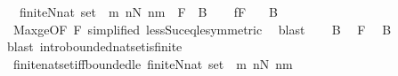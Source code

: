 \begin{isabellebody}
\ \ {\isachardoublequoteopen}finite{\isacharparenleft}{\kern0pt}N{\isacharcolon}{\kern0pt}{\isacharcolon}{\kern0pt}nat\ set{\isacharparenright}{\kern0pt}\ {\isacharequal}{\kern0pt}\ {\isacharparenleft}{\kern0pt}{\isasymexists}m{\isachardot}{\kern0pt}\ {\isasymforall}n{\isasymin}N{\isachardot}{\kern0pt}\ n{\isacharless}{\kern0pt}m{\isacharparenright}{\kern0pt}{\isachardoublequoteclose}\ {\isacharparenleft}{\kern0pt}\ {\isachardoublequoteopen}{\isacharquery}{\kern0pt}F\ {\isacharequal}{\kern0pt}\ {\isacharquery}{\kern0pt}B{\isachardoublequoteclose}{\isacharparenright}{\kern0pt}\isanewline
%
\isadelimproof
%
\endisadelimproof
%
\isatagproof
{}\isamarkupfalse%
\isanewline
\ \ \isamarkupfalse%
\ f{\isacharcolon}{\kern0pt}{\isacharquery}{\kern0pt}F\ \ \isamarkupfalse%
\ {\isacharquery}{\kern0pt}B\isanewline
\ \ \ \ \isamarkupfalse%
\ Max{\isacharunderscore}{\kern0pt}ge{\isacharbrackleft}{\kern0pt}OF\ {\isacartoucheopen}{\isacharquery}{\kern0pt}F{\isacartoucheclose}{\isacharcomma}{\kern0pt}\ simplified\ less{\isacharunderscore}{\kern0pt}Suc{\isacharunderscore}{\kern0pt}eq{\isacharunderscore}{\kern0pt}le{\isacharbrackleft}{\kern0pt}symmetric{\isacharbrackright}{\kern0pt}{\isacharbrackright}{\kern0pt}\ \isamarkupfalse%
\ blast\isanewline
{}\isamarkupfalse%
\isanewline
\ \ \isamarkupfalse%
\ {\isacharquery}{\kern0pt}B\ \isamarkupfalse%
\ {\isacharquery}{\kern0pt}F\ \isamarkupfalse%
\ {\isacartoucheopen}{\isacharquery}{\kern0pt}B{\isacartoucheclose}\ \isamarkupfalse%
{\isacharparenleft}{\kern0pt}blast\ intro{\isacharcolon}{\kern0pt}bounded{\isacharunderscore}{\kern0pt}nat{\isacharunderscore}{\kern0pt}set{\isacharunderscore}{\kern0pt}is{\isacharunderscore}{\kern0pt}finite{\isacharparenright}{\kern0pt}\isanewline
{}\isamarkupfalse%
%
\endisatagproof
{\isafoldproof}%
%
\isadelimproof
\isanewline
%
\endisadelimproof
\isanewline
{}\isamarkupfalse%
\ finite{\isacharunderscore}{\kern0pt}nat{\isacharunderscore}{\kern0pt}set{\isacharunderscore}{\kern0pt}iff{\isacharunderscore}{\kern0pt}bounded{\isacharunderscore}{\kern0pt}le{\isacharcolon}{\kern0pt}\ {\isachardoublequoteopen}finite{\isacharparenleft}{\kern0pt}N{\isacharcolon}{\kern0pt}{\isacharcolon}{\kern0pt}nat\ set{\isacharparenright}{\kern0pt}\ {\isacharequal}{\kern0pt}\ {\isacharparenleft}{\kern0pt}{\isasymexists}m{\isachardot}{\kern0pt}\ {\isasymforall}n{\isasymin}N{\isachardot}{\kern0pt}\ n{\isasymle}m{\isacharparenright}{\kern0pt}{\isachardoublequoteclose}\isanewline

\end{isabellebody}
